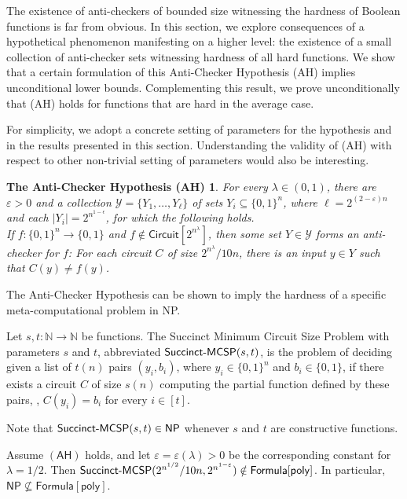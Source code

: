 \documentclass{toc}
\newtheorem*{antichecker}{The Anti-Checker Hypothesis (AH)}
\newcommand{\MCSP}{\ensuremath{{\sf MCSP}}\xspace}
\newcommand{\Succinct}{\ensuremath{{\sf Succinct}\text{-}\ensuremath{\MCSP}}\xspace}
\begin{document}
The existence of anti-checkers of bounded size witnessing the hardness of Boolean functions is far from obvious. In this section, we explore consequences of a hypothetical phenomenon manifesting on a higher level: the existence of a small collection of anti-checker sets witnessing hardness of all hard functions. We show that a certain formulation of this Anti-Checker Hypothesis (AH) implies unconditional lower bounds. Complementing this result, we prove unconditionally that (AH) holds for functions that are hard in the average case.
 
For simplicity, we adopt a concrete setting of parameters for the hypothesis and in the results presented in this section. Understanding the validity of (AH) with respect to other non-trivial setting of parameters would also be interesting.

\begin{antichecker} For every $\lambda\in (0,1)$, there are $\varepsilon >0$ and a collection $\mathcal{Y} = \{Y_1, \ldots, Y_\ell\}$ of sets $Y_i \subseteq \{0,1\}^n$, where $\ell = 2^{(2 - \varepsilon)n}$ and each $|Y_i| = 2^{n^{1-\epsilon}}$, for which the following holds.\\

\vspace{-0.3cm}
If $f \colon \{0,1\}^n \to \{0,1\}$ and $f \notin \mathsf{Circuit}[2^{n^{\lambda}}]$, then some set $Y \in \mathcal{Y}$ forms an anti-checker for $f$\emph{:} For each circuit $C$ of size $2^{n^{\lambda}}/10n$, there is an input $y\in Y$ such that $C(y)\ne f(y)$.
\end{antichecker}

The Anti-Checker Hypothesis  can be shown to imply the hardness of a specific meta-computational problem in NP.

\begin{definition} Let $s,t \colon \mathbb{N}\rightarrow \mathbb{N}$ be functions. The Succinct Minimum Circuit Size Problem with parameters $s$ and $t$, abbreviated $\Succinct(s,t)$, is the problem of deciding given a list of $t(n)$ pairs $(y_i,b_i)$, where $y_i\in\{0,1\}^n$ and $b_i\in\{0,1\}$, if there exists a circuit $C$ of size $s(n)$ computing the partial function defined by these pairs, \ie, $C(y_i)=b_i$ for every $i \in [t]$.
\end{definition}

Note that $\Succinct(s,t) \in \mathsf{NP}$ whenever $s$ and $t$ are constructive functions. 


\begin{theorem}\label{thm:AH_implication} Assume $(\mathsf{AH})$ holds, and let $\varepsilon = \varepsilon(\lambda)  > 0$ be the corresponding constant for $\lambda = 1/2$. Then $\Succinct(2^{n^{1/2}}/10n, 2^{n^{1 - \varepsilon}}) \notin \mathsf{Formula}[\mathsf{poly}]$. In particular, $\mathsf{NP} \nsubseteq \mathsf{Formula}[\mathsf{poly}]$.
\end{theorem}
\end{document}
